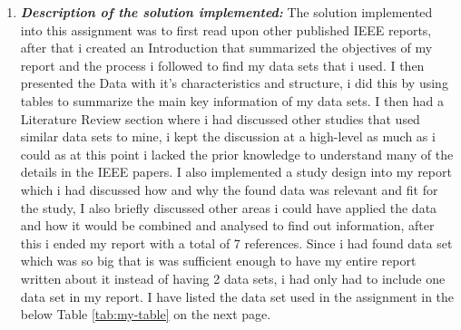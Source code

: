 \documentclass[12pt]{article}
\begin{document}
\begin{enumerate}


\item \textbf{\emph{Description of the solution implemented: }} The solution implemented into this assignment was to first read upon other published IEEE reports, after that i created an Introduction that summarized the objectives of my report and the process i followed to find my data sets that i used.
I then presented the Data with it's characteristics and structure, i did this by using tables to summarize the main key information of my data sets. I then had a Literature Review section where i had discussed other studies that used similar data sets to mine, i kept the discussion at a high-level as much as i could as at this point i lacked the prior knowledge to understand many of the details in the IEEE papers.
I also implemented a study design into my report which i had discussed how and why the found data was relevant and fit for the study, I also briefly discussed other areas i could have applied the data and how it would be combined and analysed to find out information, after this i ended my report with a total of 7 references.
Since i had found data set which was so big that is was sufficient enough to have my entire report written about it instead of having 2 data sets, i had only had to include one data set in my report. I have listed the data set used in the assignment in the below Table \ref{tab:my-table} on the next page.
\end{enumerate}
\newpage
\end{document}
